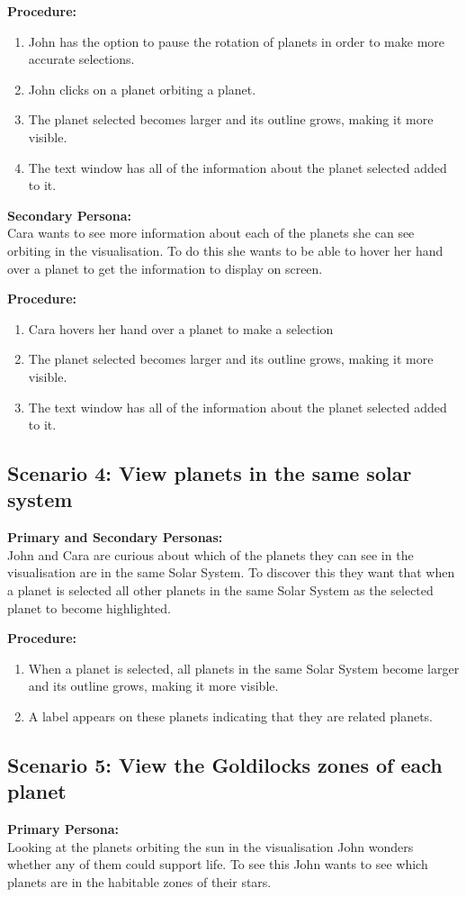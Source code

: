   {\bf  Procedure:}
   \begin{enumerate}
 \item John has the option to pause the rotation of planets in order to make
more accurate selections. 
 \item John clicks on a planet orbiting a planet.
\item The planet selected becomes larger and its outline grows, making it more
visible.
\item The text window has all of the information about the planet selected added
to it.
 \end{enumerate}
   {\bf  Secondary Persona:}\\
 Cara wants to see more information about each of the planets she can see
orbiting in the visualisation. To do this she wants to be able to hover her hand
over a planet to get the information to display on screen.
 
  {\bf  Procedure:}
   \begin{enumerate}
 \item Cara hovers her hand over a planet to make a selection
 \item The planet selected becomes larger and its outline grows, making it more
visible.
\item The text window has all of the information about the planet selected added
to it.
 \end{enumerate}
 \subsection{Scenario 4: View planets in the same solar system}
   {\bf  Primary and Secondary Personas:}\\
John and Cara are curious about which of the planets they can see in the
visualisation are in the same Solar System. To discover this they want that when
a planet is selected all other planets in the same Solar System as the selected
planet to become highlighted.
 
  {\bf  Procedure:}
   \begin{enumerate}
 \item When a planet is selected, all planets in the same Solar System become
larger and its outline grows, making it more visible.
 \item A label appears on these planets indicating that they are related
planets.
 \end{enumerate}
 \subsection{Scenario 5: View the Goldilocks zones of each planet}
   {\bf  Primary Persona:}\\
   Looking at the planets orbiting the sun in the visualisation John wonders
whether any of them could support life. To see this John wants to see which
planets are in the habitable zones of their stars. 
 
